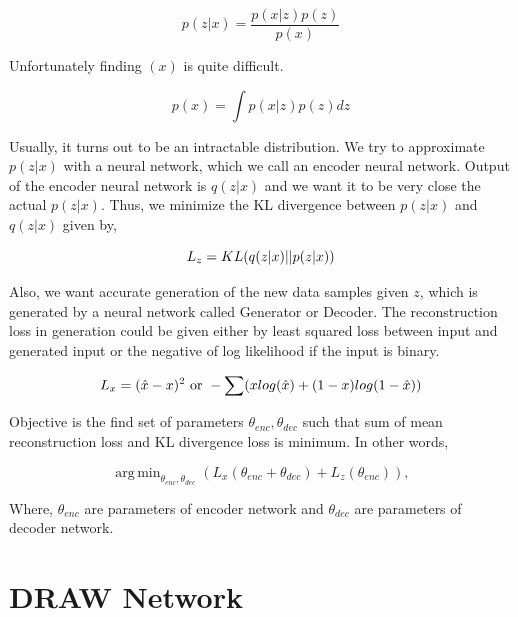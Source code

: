 \documentclass{scrartcl}
\DeclareMathOperator*{\argminA}{arg\,min}
\begin{document}
\begin{equation}
  p(z|x) = \frac{p(x|z)p(z)}{p(x)}
\end{equation}

Unfortunately finding $(x)$ is quite difficult.

\begin{equation}
  p(x) = \int p(x|z) p(z) dz
\end{equation}

Usually, it turns out to be an intractable distribution.
We try to approximate $p(z|x)$ with a neural network, which we call an encoder neural network.
Output of the encoder neural network is $q(z|x)$ and we want it to be very close the actual $p(z|x)$.
Thus, we minimize the KL divergence between $p(z|x)$ and $q(z|x)$ given by,

\begin{equation}\label{kl}
  L_{z} =  KL(q(z|x)||p(z|x)) \\
\end{equation}

Also, we want accurate generation of the new data samples given $z$, which is generated by a neural network called Generator or Decoder.
The reconstruction loss in generation could be given either by least squared loss between input and generated input or the negative of log likelihood if the input is binary.

\begin{equation}\label{rec}
  L_{x} = (\hat{x} - x)^2 \text{ or } - \sum (x log(\hat{x}) + (1-x) log(1-\hat{x}))\\
\end{equation}

Objective is the find set of parameters $ \theta_{enc}, \theta_{dec}$ such that sum of mean reconstruction loss and KL divergence loss is minimum.
In other words,

\begin{equation}
  \argminA_{\theta_{enc}, \theta_{dec}} (L_{x}(\theta_{enc} + \theta_{dec}) + L_{z}(\theta_{enc})),
\end{equation}

Where, $\theta_{enc} $ are parameters of encoder network and $ \theta_{dec}$ are parameters of decoder network.

\section{DRAW Network}
\end{document}

